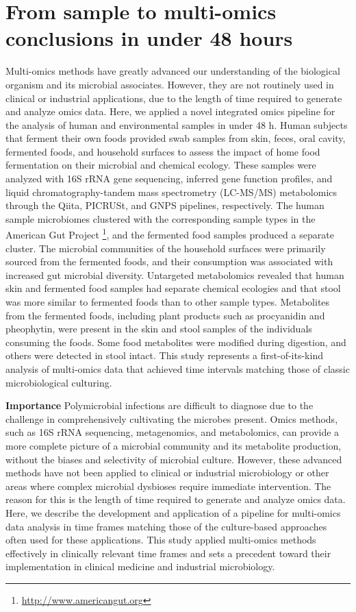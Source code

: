 \glsresetall

\section{From sample to multi-omics conclusions in under 48 hours}\label{section_48hours}
Multi-omics methods have greatly advanced our understanding of the biological organism
and its microbial associates. However, they are not routinely used in clinical or
industrial applications, due to the length of time required to generate and analyze
omics data. Here, we applied a novel integrated omics pipeline for the analysis of
human and environmental samples in under 48 h. Human subjects that ferment their
own foods provided swab samples from skin, feces, oral cavity, fermented foods,
and household surfaces to assess the impact of home food fermentation on their
microbial and chemical ecology. These samples were analyzed with 16S rRNA gene
sequencing, inferred gene function profiles, and liquid chromatography-tandem mass
spectrometry (LC-MS/MS) metabolomics through the Qiita, PICRUSt, and GNPS pipelines,
respectively. The human sample microbiomes clustered with the corresponding sample
types in the American Gut Project \footnote{\url{http://www.americangut.org}}, and
the fermented food samples produced a separate cluster. The microbial communities
of the household surfaces were primarily sourced from the fermented foods, and
their consumption was associated with increased gut microbial diversity.
Untargeted metabolomics revealed that human skin and fermented food samples
had separate chemical ecologies and that stool was more similar to fermented
foods than to other sample types. Metabolites from the fermented foods, including
plant products such as procyanidin and pheophytin, were present in the skin and
stool samples of the individuals consuming the foods. Some food metabolites were
modified during digestion, and others were detected in stool intact. This study
represents a first-of-its-kind analysis of multi-omics data that achieved time
intervals matching those of classic microbiological culturing.

\textbf{Importance} Polymicrobial infections are difficult to diagnose due to the
challenge in comprehensively cultivating the microbes present. Omics methods, such
as 16S rRNA sequencing, metagenomics, and metabolomics, can provide a more complete
picture of a microbial community and its metabolite production, without the biases
and selectivity of microbial culture. However, these advanced methods have not
been applied to clinical or industrial microbiology or other areas where complex
microbial dysbioses require immediate intervention. The reason for this is the
length of time required to generate and analyze omics data. Here, we describe the
development and application of a pipeline for multi-omics data analysis in time
frames matching those of the culture-based approaches often used for these
applications. This study applied multi-omics methods effectively in clinically
relevant time frames and sets a precedent toward their implementation in clinical
medicine and industrial microbiology.

